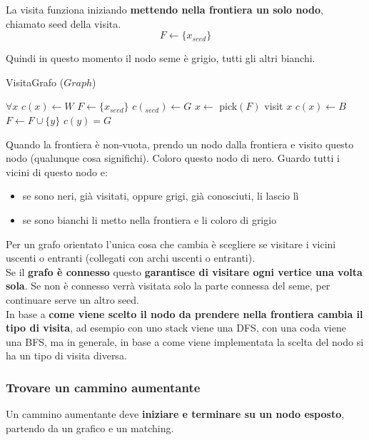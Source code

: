La visita funziona iniziando \textbf{mettendo nella frontiera un solo nodo}, chiamato seed della visita. 
$$ F \leftarrow \{x_{seed}\}$$

Quindi in questo momento il nodo seme è grigio, tutti gli altri bianchi.
\begin{algorithm}
	\caption{VisitaGrafo ($Graph$)}
	\begin{algorithmic}
		\STATE $\forall x$ $c(x) \leftarrow W$
		\STATE $F \leftarrow \{x_{seed}\}$
		\STATE $c (_{seed}) \leftarrow G$
			\STATE $x \leftarrow $ pick$(F)$
			\STATE visit $x$
			\STATE $c(x) \leftarrow B$
					\STATE $F \leftarrow F \cup \{y\}$
					\STATE $c(y) = G$
				\ENDIF
			\ENDFOR
		\ENDWHILE
	\end{algorithmic}
\end{algorithm}

\newpage

Quando la frontiera è non-vuota, prendo un nodo dalla frontiera e visito questo nodo (qualunque cosa significhi). Coloro questo nodo di nero. Guardo tutti i vicini di questo nodo e:
\begin{itemize}
	\item se sono neri, già visitati, oppure grigi, già conosciuti, li lascio lì
	\item se sono bianchi li metto nella frontiera e li coloro di grigio
\end{itemize}

Per un grafo orientato l'unica cosa che cambia è scegliere se visitare i vicini uscenti o entranti (collegati con archi uscenti o entranti).\\

Se il \textbf{grafo è connesso} questo \textbf{garantisce di visitare ogni vertice una volta sola}. Se non è connesso verrà visitata solo la parte connessa del seme, per continuare serve un altro seed.\\

In base a \textbf{come viene scelto il nodo da prendere nella frontiera cambia il tipo di visita}, ad esempio con uno stack viene una DFS, con una coda viene una BFS, ma in generale, in base a come viene implementata la scelta del nodo si ha un tipo di visita diversa.\\

\newpage

\subsubsection{Trovare un cammino aumentante}
Un cammino aumentante deve \textbf{iniziare e terminare su un nodo esposto}, partendo da un grafico e un matching. \\

